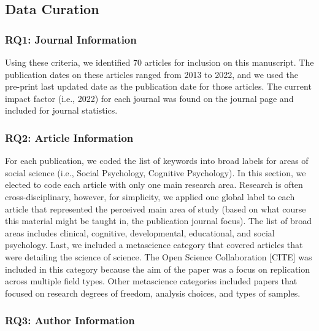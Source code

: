 \documentclass[
  man]{apa6}
\begin{document}
\hypertarget{data-curation}{%
\subsection{Data Curation}\label{data-curation}}

\hypertarget{rq1-journal-information}{%
\subsubsection{RQ1: Journal Information}\label{rq1-journal-information}}

Using these criteria, we identified 70 articles for inclusion on this manuscript. The publication dates on these articles ranged from 2013 to 2022, and we used the pre-print last updated date as the publication date for those articles. The current impact factor (i.e., 2022) for each journal was found on the journal page and included for journal statistics.

\hypertarget{rq2-article-information}{%
\subsubsection{RQ2: Article Information}\label{rq2-article-information}}

For each publication, we coded the list of keywords into broad labels for areas of social science (i.e., Social Psychology, Cognitive Psychology). In this section, we elected to code each article with only one main research area. Research is often cross-disciplinary, however, for simplicity, we applied one global label to each article that represented the perceived main area of study (based on what course this material might be taught in, the publication journal focus). The list of broad areas includes clinical, cognitive, developmental, educational, and social psychology. Last, we included a metascience category that covered articles that were detailing the science of science. The Open Science Collaboration {[}CITE{]} was included in this category because the aim of the paper was a focus on replication across multiple field types. Other metascience categories included papers that focused on research degrees of freedom, analysis choices, and types of samples.

\hypertarget{rq3-author-information}{%
\subsubsection{RQ3: Author Information}\label{rq3-author-information}}
\end{document}
